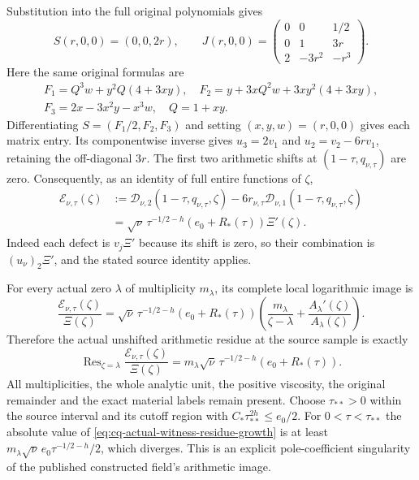 Substitution into the full original polynomials gives
\[
 S(r,0,0)=(0,0,2r),\qquad
 J(r,0,0)=
 \begin{pmatrix}
 0&0&1/2\\
 0&1&3r\\
 2&-3r^2&-r^3
 \end{pmatrix}.
\]
Here the same original formulas are
\[
 \begin{gathered}
 F_1=Q^3w+y^2Q(4+3xy),\quad
 F_2=y+3xQ^2w+3xy^2(4+3xy),\\
 F_3=2x-3x^2y-x^3w,\quad Q=1+xy.
 \end{gathered}
\]
Differentiating $S=(F_1/2,F_2,F_3)$ and setting $(x,y,w)=(r,0,0)$
gives each matrix entry. Its componentwise inverse gives
$u_3=2v_1$ and $u_2=v_2-6rv_1$, retaining the off-diagonal $3r$.
The first two arithmetic shifts at $(1-\tau,q_{\nu,\tau})$ are zero.
Consequently, as an identity of full entire functions of $\zeta$,
\begin{equation}
\begin{split}
 \mathcal E_{\nu,\tau}(\zeta)
 &:=\mathcal D_{\nu,2}(1-\tau,q_{\nu,\tau},\zeta)
       -6r_{\nu,\tau}
          \mathcal D_{\nu,1}(1-\tau,q_{\nu,\tau},\zeta)\\
 &=\sqrt\nu\,\tau^{-1/2-h}
                    (e_0+R_*(\tau))\Xi'(\zeta).
\end{split}
 \label{eq:cq-actual-witness-entire-defect}
\end{equation}
Indeed each defect is $v_j\Xi'$ because its shift is zero, so their
combination is $(u_\nu)_2\Xi'$, and the stated source identity applies.

For every actual zero $\lambda$ of multiplicity $m_\lambda$, its
complete local logarithmic image is
\begin{equation}
 \frac{\mathcal E_{\nu,\tau}(\zeta)}{\Xi(\zeta)}
 =\sqrt\nu\,\tau^{-1/2-h}(e_0+R_*(\tau))
     \left(\frac{m_\lambda}{\zeta-\lambda}
                    +\frac{A_\lambda'(\zeta)}{A_\lambda(\zeta)}\right).
 \label{eq:cq-actual-witness-meromorphic-defect}
\end{equation}
Therefore the actual unshifted arithmetic residue at the source
sample is exactly
\begin{equation}
 \operatorname{Res}_{\zeta=\lambda}
       \frac{\mathcal E_{\nu,\tau}(\zeta)}{\Xi(\zeta)}
 =m_\lambda\sqrt\nu\,\tau^{-1/2-h}
                           (e_0+R_*(\tau)).
 \label{eq:cq-actual-witness-residue-growth}
\end{equation}
All multiplicities, the whole analytic unit, the positive viscosity,
the original remainder and the exact material labels remain present.
Choose $\tau_{**}>0$ within the source interval and its cutoff region
with $C_*\tau_{**}^{2h}\leq e_0/2$. For $0<\tau<\tau_{**}$ the
absolute value of \eqref{eq:cq-actual-witness-residue-growth} is at
least $m_\lambda\sqrt\nu\,e_0\tau^{-1/2-h}/2$, which diverges.
This is an explicit pole-coefficient singularity of the published
constructed field's arithmetic image.

